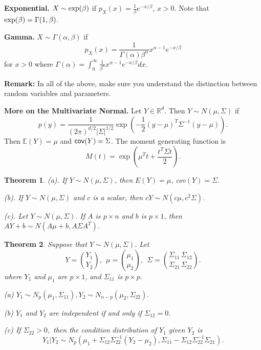 \documentclass[twoside,12pt]{article}
\newcounter{lecnum}
\newtheorem{theorem}{Theorem}[lecnum]
\begin{document}
\vspace{.2cm}

{\bf Exponential.}
$X\sim {\rm exp}(\beta)$ if
$p_X(x) = \frac{1}{\beta} e^{-x/\beta}$, $x>0$.
Note that ${\rm exp}(\beta)=\Gamma(1,\beta)$. 

\vspace{.2cm}

{\bf Gamma.}
$X \sim \Gamma(\alpha,\beta)$ if
$$
p_X(x) = \frac 1{\Gamma(\alpha) \beta^\alpha} x^{\alpha-1} e^{-x/\beta}
$$
for $x>0$
where
$\Gamma(\alpha) = \int_0^\infty \frac 1{\beta^\alpha} x^{\alpha-1} e^{-x/\beta} dx$.

\vspace{1cm}

{\bf Remark:}
In all of the above, make sure you understand the distinction between
random variables and parameters.

\vspace{1cm}

{\bf More on the Multivariate Normal.}
Let $Y\in \mathbb{R}^d$. Then
$Y \sim N(\mu,\Sigma)$ if
$$
p(y) = \frac{1}{(2\pi)^{d/2} |\Sigma|^{1/2}}
\exp\left(-\frac{1}{2}(y-\mu)^T \Sigma^{-1} (y-\mu)\right).
$$
Then
$\mathbb{E}(Y) = \mu$ and
${\sf cov}(Y) = \Sigma$.
The moment generating function is
$$
M(t) = \exp\left( \mu^T t + \frac{t^T \Sigma t}{2}\right).
$$



\begin{theorem}
(a).  If $Y\sim N(\mu, \Sigma)$,
then $E(Y) = \mu$, cov$(Y) = \Sigma.$

(b).  
If $Y\sim N(\mu, \Sigma)$ and $c$ is a scalar, then
$cY\sim N(c\mu, c^2\Sigma).$  

(c). Let $Y\sim N(\mu, \Sigma).$  
If $A$ is $p \times n$ and 
$b$ is $p\times 1$, 
then $A Y + b \sim N(A\mu + b, A\Sigma A^T )$.
\end{theorem}



\begin{theorem}
Suppose that $Y\sim N(\mu, \Sigma)$.
Let 
$$
Y={Y_1 \choose Y_2}, \ \ \mu = {\mu_1 \choose
  \mu_2}, \ \ \Sigma = 
{\Sigma_{11}\,\Sigma_{12}\choose\Sigma_{21}\,\Sigma_{22}}.
$$
where $Y_1$ and $\mu_1$ are $p \times 1$, and $\Sigma_{11}$ is $p
\times p$.

(a) $Y_1 \sim N_p(\mu_1, \Sigma_{11}),Y_2 \sim
N_{n-p}(\mu_2, \Sigma_{22}).$

(b)  $Y_1$ and  $Y_2$ are independent if and only
if $\Sigma_{12}=0$.

(c)  If $\Sigma_{22}>0,$ then the condition distribution of  
$Y_1$ given $Y_2$ is 
\begin{equation}
Y_1|Y_2 \sim
N_p(\mu_1+\Sigma_{12}\Sigma_{22}^{-1}(Y_2 - \mu_2),
\Sigma_{11}-\Sigma_{12}\Sigma_{22}^{-1}\Sigma_{21}).
\end{equation}
\end{theorem}
\end{document}
